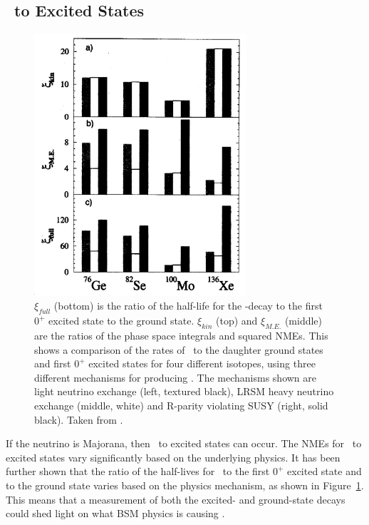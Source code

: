 \documentclass[/main.tex]{subfiles}
\begin{document}
\subsection{\znbb\ to Excited States}
\begin{figure}[t]
  \centering
  \includegraphics[width=0.7\textwidth]{esmechanismratio}
  \caption[\znbb\ to excited states for different \znbb\ mechanisms]{\label{fig:esmechanism}
    $\xi_{full}$ (bottom) is the ratio of the half-life for the \bb-decay to the first $0^+$ excited state to the ground state. $\xi_{kin}$ (top) and $\xi_{M.E.}$ (middle) are the ratios of the phase space integrals and squared NMEs. This shows a comparison of the rates of \znbb\ to the daughter ground states and first $0^+$ excited states for four different isotopes, using three different mechanisms for producing \znbb. The mechanisms shown are light neutrino exchange (left, textured black), LRSM heavy neutrino exchange (middle, white) and R-parity violating SUSY (right, solid black). Taken from \cite{Simkovic2002}.
  }
\end{figure}
If the neutrino is Majorana, then \znbb\ to excited states can occur.
The NMEs for \znbb\ to excited states vary significantly based on the underlying physics.
It has been further shown that the ratio of the half-lives for \znbb\ to the first $0^+$ excited state and to the ground state varies based on the physics mechanism, as shown in Figure~\ref{fig:esmechanism}\cite{Simkovic2002, Suhonen2016}.
This means that a measurement of both the excited- and ground-state decays could shed light on what BSM physics is causing \znbb.
\end{document}
